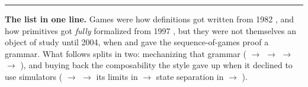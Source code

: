 \documentclass[11pt]{article}
\begin{document}
\vspace{1em}
\noindent\rule{\linewidth}{0.4pt}

\medskip\noindent
\textbf{The list in one line.} Games were how definitions got written from 1982
\cite{GM82}, and how primitives got \emph{fully} formalized from 1997
\cite{BDJR97}, but they were not themselves an object of study until 2004, when
\cite{Shou04} and \cite{BR04} gave the sequence-of-games proof a grammar. What
follows splits in two: mechanizing that grammar (\cite{Hal05} $\to$
\cite{CryptoVerif06} $\to$ \cite{CertiCrypt09} $\to$ \cite{EasyCrypt11} $\to$
\cite{CryptHOL17,SSProve21}), and buying back the composability the style gave
up when it declined to use simulators (\cite{CK01} $\to$ \cite{MRH04} $\to$ its
limits in \cite{RSS11} $\to$ state separation in \cite{SSP18} $\to$
\cite{BDEFKK22}).



\end{document}
